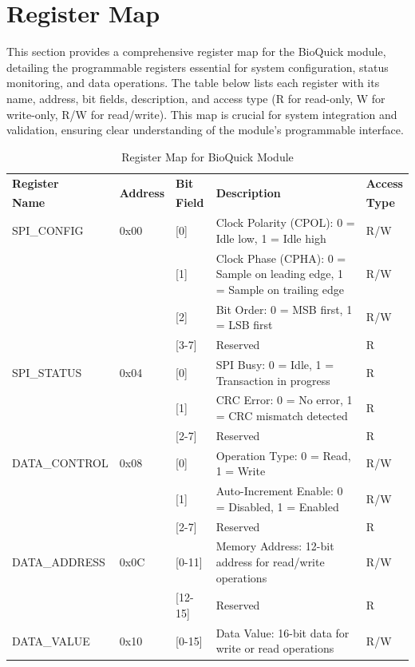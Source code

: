 \section{Register Map}

This section provides a comprehensive register map for the BioQuick module, detailing the programmable registers essential for system configuration, status monitoring, and data operations. The table below lists each register with its name, address, bit fields, description, and access type (R for read-only, W for write-only, R/W for read/write). This map is crucial for system integration and validation, ensuring clear understanding of the module's programmable interface.


\begin{table}[!htb]
    \centering
    \caption{Register Map for BioQuick Module}
    \label{tab:register-map}
    \begin{tabular}{|m{}|m{}|m{}|m{}|m{}|}
        \hline
        \textbf{Register} & \multirow{2}{*}{\textbf{Address}} & \textbf{Bit} & \multirow{2}{*}{\textbf{Description}} & \textbf{Access} \\
        \textbf{Name} & & \textbf{Field} & & \textbf{Type} \\
        \hline
        SPI\_CONFIG & 0x00 & [0] & Clock Polarity (CPOL): 0 = Idle low, 1 = Idle high & R/W \\
        & & [1] & Clock Phase (CPHA): 0 = Sample on leading edge, 1 = Sample on trailing edge & R/W \\
        & & [2] & Bit Order: 0 = MSB first, 1 = LSB first & R/W \\
        & & [3-7] & Reserved & R \\
        \hline
        SPI\_STATUS & 0x04 & [0] & SPI Busy: 0 = Idle, 1 = Transaction in progress & R \\
        & & [1] & CRC Error: 0 = No error, 1 = CRC mismatch detected & R \\
        & & [2-7] & Reserved & R \\
        \hline
        DATA\_CONTROL & 0x08 & [0] & Operation Type: 0 = Read, 1 = Write & R/W \\
        & & [1] & Auto-Increment Enable: 0 = Disabled, 1 = Enabled & R/W \\
        & & [2-7] & Reserved & R \\
        \hline
        DATA\_ADDRESS & 0x0C & [0-11] & Memory Address: 12-bit address for read/write operations & R/W \\
        & & [12-15] & Reserved & R \\
        \hline
        DATA\_VALUE & 0x10 & [0-15] & Data Value: 16-bit data for write or read operations & R/W \\
        \hline
    \end{tabular}
\end{table}
